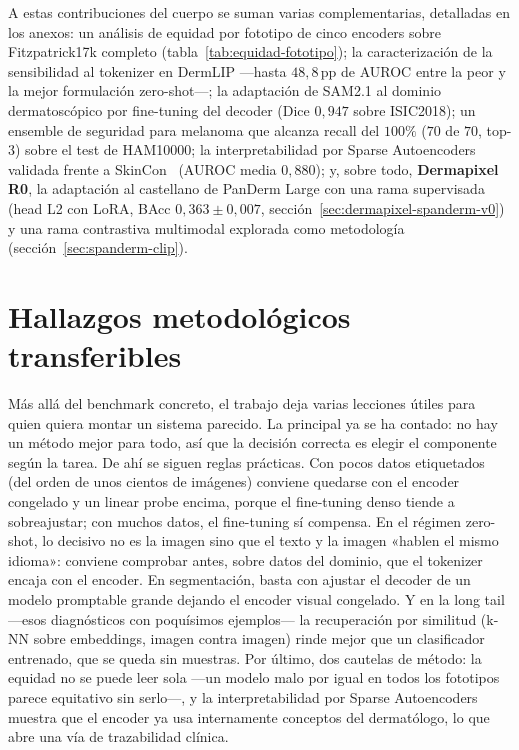 \label{sec:contrib-anexos}%
A estas contribuciones del cuerpo se suman varias complementarias,
detalladas en los anexos: un análisis de equidad por fototipo de cinco
encoders sobre Fitzpatrick17k completo (tabla~\ref{tab:equidad-fototipo});
la caracterización de la sensibilidad al tokenizer en DermLIP ---hasta
$48{,}8$\,pp de AUROC entre la peor y la mejor formulación zero-shot---;
la adaptación de SAM2.1 al dominio dermatoscópico por fine-tuning del
decoder (Dice $0{,}947$ sobre ISIC2018); un ensemble de seguridad para
melanoma que alcanza recall del $100\%$ ($70$ de $70$, top-3) sobre el
test de HAM10000; la interpretabilidad por Sparse Autoencoders validada
frente a SkinCon~\cite{skincon} (AUROC media $0{,}880$); y, sobre todo,
\textbf{Dermapixel R0}, la adaptación al castellano de PanDerm Large con
una rama supervisada (head L2 con LoRA, BAcc $0{,}363 \pm 0{,}007$,
sección~\ref{sec:dermapixel-spanderm-v0}) y una rama contrastiva
multimodal explorada como metodología (sección~\ref{sec:spanderm-clip}).

\section{Hallazgos metodológicos transferibles}

Más allá del benchmark concreto, el trabajo deja varias lecciones útiles
para quien quiera montar un sistema parecido. La principal ya se ha
contado: no hay un método mejor para todo, así que la decisión correcta
es elegir el componente según la tarea. De ahí se siguen reglas
prácticas. Con pocos datos etiquetados (del orden de unos cientos de
imágenes) conviene quedarse con el encoder congelado y un linear probe
encima, porque el fine-tuning denso tiende a sobreajustar; con muchos
datos, el fine-tuning sí compensa. En el régimen zero-shot, lo decisivo
no es la imagen sino que el texto y la imagen «hablen el mismo idioma»:
conviene comprobar antes, sobre datos del dominio, que el tokenizer
encaja con el encoder. En segmentación, basta con ajustar el decoder de
un modelo promptable grande dejando el encoder visual congelado. Y en la
long tail ---esos diagnósticos con poquísimos ejemplos--- la recuperación
por similitud (k-NN sobre embeddings, imagen contra imagen) rinde mejor
que un clasificador entrenado, que se queda sin muestras. Por último, dos
cautelas de método: la equidad no se puede leer sola ---un modelo malo por
igual en todos los fototipos parece equitativo sin serlo---, y la
interpretabilidad por Sparse Autoencoders muestra que el encoder ya usa
internamente conceptos del dermatólogo, lo que abre una vía de
trazabilidad clínica.


